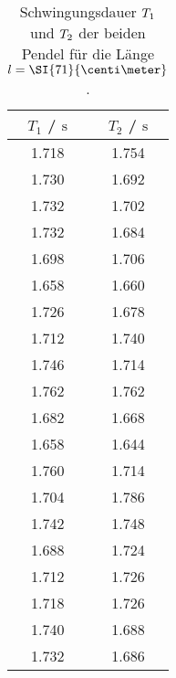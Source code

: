 \begin{table}
    \centering
    \caption{Schwingungsdauer $\protect T_{1}$ und $\protect T_{2}$ der beiden Pendel für die Länge $\protect l = \SI{71}{\centi\meter}$.}
    \label{tab:t1t2_71}
    \begin{tabular}{c |c}
        \toprule
        $T_{1}$ / $\si{\second}$  & $T_{2}$ / $\si{\second}$ \\
        \midrule
        1.718 &  1.754 \\
        1.730  &  1.692 \\
        1.732 &  1.702 \\
        1.732 &  1.684 \\
        1.698 &  1.706 \\
        1.658 &  1.660  \\
        1.726 &  1.678 \\
        1.712 &  1.740  \\
        1.746 &  1.714 \\
        1.762 &  1.762 \\
        1.682 &  1.668 \\
        1.658 &  1.644 \\
        1.760  &  1.714 \\
        1.704 &  1.786 \\
        1.742 &  1.748 \\
        1.688 &  1.724 \\
        1.712 &  1.726 \\
        1.718 &  1.726 \\
        1.740  &  1.688 \\
        1.732 &  1.686 \\
        \bottomrule
    \end{tabular}
\end{table}

